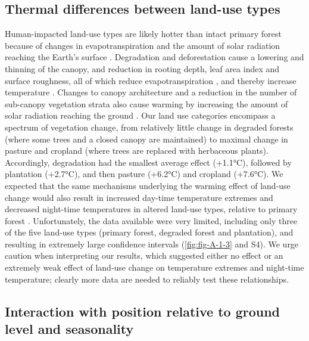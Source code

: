 \documentclass[12pt,a4paper,]{report}
\theoremstyle{definition}
\theoremstyle{definition}
\theoremstyle{definition}
\theoremstyle{remark}
\begin{document}
\subsection{Thermal differences between land-use
types}\label{thermal-differences-between-land-use-types}

Human-impacted land-use types are likely hotter than intact primary
forest because of changes in evapotranspiration and the amount of solar
radiation reaching the Earth's surface
\citep{oke_boundary1987, findell_modeled2007, davin_climatic2010}.
Degradation and deforestation cause a lowering and thinning of the
canopy, and reduction in rooting depth, leaf area index and surface
roughness, all of which reduce evapotranspiration
\citep{okuda_effect2003, snyder_analyzing2004, kumar_effects2005, findell_modeled2007, davin_climatic2010, hardwick_relationship2015},
and thereby increase temperature
\citep{oke_boundary1987, foley_global2005}. Changes to canopy
architecture and a reduction in the number of sub-canopy vegetation
strata also cause warming by increasing the amount of solar radiation
reaching the ground \citep{oke_boundary1987, murcia_edge1995}. Our land
use categories encompass a spectrum of vegetation change, from
relatively little change in degraded forests (where some trees and a
closed canopy are maintained) to maximal change in pasture and cropland
(where trees are replaced with herbaceous plants). Accordingly,
degradation had the smallest average effect (+1.1°C), followed by
plantation (+2.7°C), and then pasture (+6.2°C) and cropland (+7.6°C). We
expected that the same mechanisms underlying the warming effect of
land-use change would also result in increased day-time temperature
extremes and decreased night-time temperatures in altered land-use
types, relative to primary forest
\citep{oke_boundary1987, chen_growing-season1995}. Unfortunately, the
data available were very limited, including only three of the five
land-use types (primary forest, degraded forest and plantation), and
resulting in extremely large confidence intervals
(\autoref{fig:fig-A-1-3} and S4). We urge caution when interpreting our
results, which suggested either no effect or an extremely weak effect of
land-use change on temperature extremes and night-time temperature;
clearly more data are needed to reliably test these relationships.

\subsection{Interaction with position relative to ground level and
seasonality}\label{interaction-with-position-relative-to-ground-level-and-seasonality}
\end{document}
